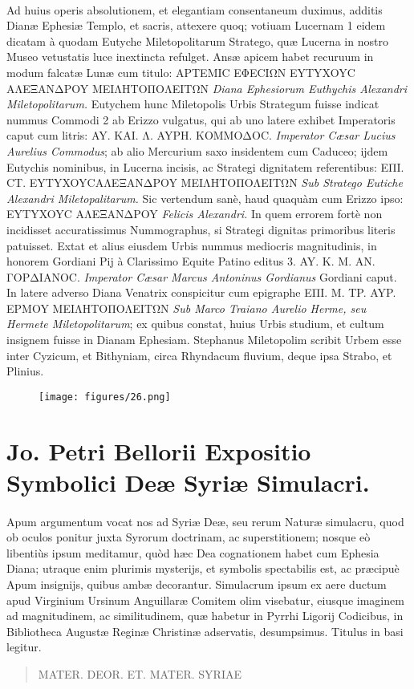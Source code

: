 \documentclass[a4paper, 11pt, oneside, polutonikogreek, latin]{article}
\begin{document}
\paragraph{}
Ad huius operis absolutionem, et elegantiam consentaneum duximus, additis Dianæ Ephesiæ Templo, et sacris, attexere quoq; votiuam Lucernam 1 eidem dicatam à quodam Eutyche Miletopolitarum Stratego, quæ Lucerna in nostro Museo vetustatis luce inextincta refulget. Ansæ apicem habet recuruum in modum falcatæ Lunæ cum titulo: APTEMIC EΦECIΩN EYTYXOYC AΛEΞANΔPOY MEIΛHTOΠOΛEITΩN \emph{Diana Ephesiorum Euthychis Alexandri Miletopolitarum.} Eutychem hunc Miletopolis Urbis Strategum fuisse indicat nummus Commodi 2 ab Erizzo vulgatus, qui ab uno latere exhibet Imperatoris caput cum litris: AY. KAI. Λ. AYPH. KOMMOΔOC. \emph{Imperator Cæsar Lucius Aurelius Commodus}; ab alio Mercurium saxo insidentem cum Caduceo; ijdem Eutychis nominibus, in Lucerna incisis, ac Strategi dignitatem referentibus: EΠI. CT. EYTYXOYCAΛEΞANΔPOY MEIΛHTOΠOΛEITΩN \emph{Sub Stratego Eutiche Alexandri Miletopalitarum.} Sic vertendum sanè, haud quaquàm cum Erizzo ipso: EYTYXOYC AΛEΞANΔPOY \emph{Felicis Alexandri.} In quem errorem fortè non incidisset accuratissimus Nummographus, si Strategi dignitas primoribus literis patuisset. Extat et alius eiusdem Urbis nummus mediocris magnitudinis, in honorem Gordiani Pij à Clarissimo Equite Patino editus 3. AY. K. M. AN. ΓOPΔIANOC. \emph{Imperator Cæsar Marcus Antoninus Gordianus} Gordiani caput. In latere adverso Diana Venatrix conspicitur cum epigraphe EΠI. M. TP. AYP. EPMOY MEIΛHTOΠOΛEITΩN \emph{Sub Marco Traiano Aurelio Herme, seu Hermete Miletopolitarum}; ex quibus constat, huius Urbis studium, et cultum insignem fuisse in Dianam Ephesiam. Stephanus Miletopolim scribit Urbem esse inter Cyzicum, et Bithyniam, circa Rhyndacum fluvium, deque ipsa Strabo, et Plinius.
\clearpage
\vspace*{\fill}
\begin{figure}[H]
\centering
\texttt{[image: figures/26.png]}
\end{figure}
\vspace*{\fill}
\clearpage
\section{Jo. Petri Bellorii Expositio Symbolici Deæ Syriæ Simulacri.}
\paragraph{}
Apum argumentum vocat nos ad Syriæ Deæ, seu rerum Naturæ simulacru, quod ob oculos ponitur juxta Syrorum doctrinam, ac superstitionem; nosque eò libentiùs ipsum meditamur, quòd hæc Dea cognationem habet cum Ephesia Diana; utraque enim plurimis mysterijs, et symbolis spectabilis est, ac præcipuè Apum insignijs, quibus ambæ decorantur. Simulacrum ipsum ex aere ductum apud Virginium Ursinum Anguillaræ Comitem olim visebatur, eiusque imaginem ad magnitudinem, ac similitudinem, quæ habetur in Pyrrhi Ligorij Codicibus, in Bibliotheca Augustæ Reginæ Christinæ adservatis, desumpsimus. Titulus in basi legitur.
\begin{quote}
MATER. DEOR. ET. MATER. SYRIAE
\end{quote}
\vspace*{-4mm}
\end{document}

